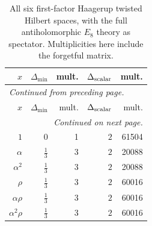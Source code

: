 \begingroup\small
\setlength{\tabcolsep}{5pt}
\begin{longtable}{rrrrr}
\caption{All six first-factor Haagerup twisted Hilbert spaces, with the full antiholomorphic $E_8$ theory as spectator. Multiplicities here include the forgetful matrix.}\label{expphysics:h3-twisted-gaps}\\
\toprule
$x$ & $\Delta_{\min}$ & mult. & $\Delta_{\rm scalar}$ & mult.\\
\midrule
\endfirsthead
\multicolumn{5}{l}{\small\itshape Continued from preceding page.}\\
\toprule
$x$ & $\Delta_{\min}$ & mult. & $\Delta_{\rm scalar}$ & mult.\\
\midrule
\endhead
\midrule
\multicolumn{5}{r}{\small\itshape Continued on next page.}\\
\endfoot
\bottomrule
\endlastfoot
$1$ & $0$ & 1 & $2$ & 61504\\
$\alpha$ & $\frac{1}{3}$ & 3 & $2$ & 20088\\
$\alpha^2$ & $\frac{1}{3}$ & 3 & $2$ & 20088\\
$\rho$ & $\frac{1}{3}$ & 3 & $2$ & 60016\\
$\alpha\rho$ & $\frac{1}{3}$ & 3 & $2$ & 60016\\
$\alpha^2\rho$ & $\frac{1}{3}$ & 3 & $2$ & 60016\\
\end{longtable}
\endgroup
